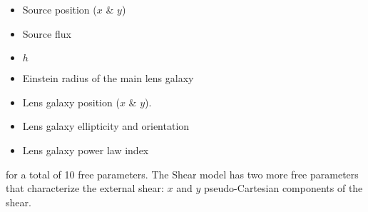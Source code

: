 \begin{itemize}
\item Source position ($x$ \& $y$)
\item Source flux
\item $h$
\item Einstein radius of the main lens galaxy
\item Lens galaxy position ($x$ \& $y$).
\item Lens galaxy ellipticity and orientation
\item Lens galaxy power law index
\end{itemize}
for a total of 10 free parameters.
The Shear model has two more free parameters that characterize the external shear: $x$ and $y$ pseudo-Cartesian components of the shear.
